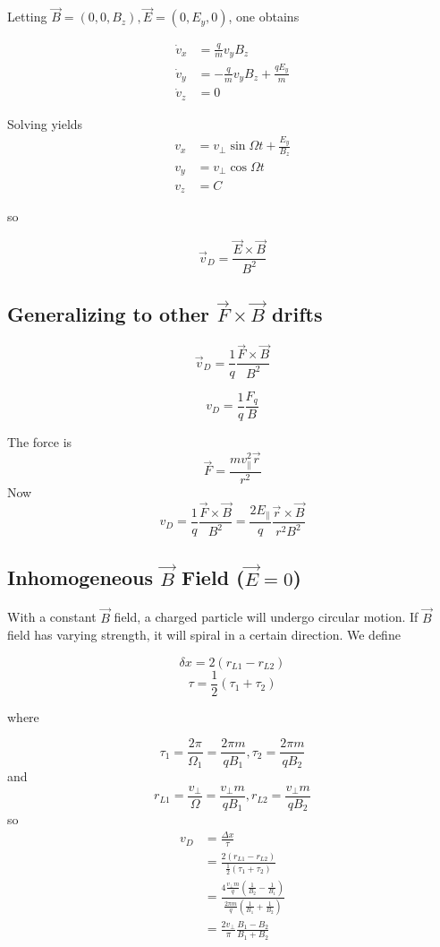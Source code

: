 \documentclass[12pt]{article}
\begin{document}
Letting $\vec B = (0, 0, B_z), \vec E = (0, E_y, 0)$, one obtains

\begin{align*}
    \dot v_x &= \frac{q}{m}v_yB_z \\
    \dot v_y &= -\frac{q}{m}v_yB_z + \frac{qE_y}{m} \\
    \dot v_z &= 0
\end{align*}

Solving yields
\begin{align*}
    v_x &= v_\perp \sin\Omega t + \frac{E_y}{B_z} \\
    v_y &= v_\perp\cos\Omega t \\
    v_z &= C
\end{align*}

so

$$\vec v_D = \frac{\vec E \times \vec B}{B^2}$$

\subsection{Generalizing to other $\vec F \times \vec B$ drifts}

$$\vec v_D = \frac{1}{q} \frac{\vec F \times \vec B}{B^2}$$

\begin{ex}[Gravity]
    $$v_D = \frac{1}{q} \frac{F_q}{B}$$
\end{ex}

\begin{ex}
    The force is
    $$\vec F = \frac{mv_\parallel^2\vec r}{r^2}$$
    Now
    $$v_D = \frac{1}{q} \frac{\vec F \times \vec B}{B^2} = \frac{2E_\parallel}{q} \frac{\vec r \times \vec B}{r^2B^2}$$
\end{ex}
    
\subsection{Inhomogeneous $\vec B$ Field ($\vec E = 0$)}

With a constant $\vec B$ field, a charged particle will undergo circular motion. If $\vec B$ field has varying strength, it will spiral in a certain direction. We define

$$\delta x = 2(r_{L1} - r_{L2})$$
$$\tau = \frac{1}{2}(\tau_1 + \tau_2)$$

where

$$\tau_1 = \frac{2\pi}{\Omega_1} = \frac{2\pi m}{qB_1}, \tau_2 = \frac{2\pi m}{qB_2}$$
and
$$r_{L1} = \frac{v_\perp}{\Omega} = \frac{v_\perp m}{qB_1}, r_{L2} = \frac{v_\perp m}{qB_2}$$
so
\begin{align*}
    v_D &= \frac{\Delta x}{\tau} \\
        &= \frac{2(r_{L1}-r_{L2})}{\frac{1}{2}(\tau_1 + \tau_2)} \\
        &= \frac{4\frac{v_\perp m}{q}(\frac{1}{B_2} - \frac{1}{B_1})}{\frac{2\pi m}{q}\left(\frac{1}{B_1} + \frac{1}{B_2}\right)} \\
        &= \frac{2v_\perp}{\pi} \frac{B_1 - B_2}{B_1 + B_2}
\end{align*}
\end{document}
